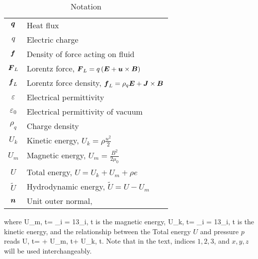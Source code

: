 \begin{table}
\begin{tabular}{ |c|l| }
        $\mbox{\boldmath $q$}$ & Heat flux\\
        $q$ & Electric charge\\
        $\mbox{\boldmath $f$}$ & Density of force acting on fluid\\
        $\mbox{\boldmath $F$}_L$ & Lorentz force, $\mbox{\boldmath $F$}_L = q\left(\mbox{\boldmath $E$} + \mbox{\boldmath $u$}\times\mbox{\boldmath $B$}\right)$\\
        $\mbox{\boldmath $f$}_L$ & Lorentz force density, $\mbox{\boldmath $f$}_L = \rho_q\mbox{\boldmath $E$} + \mbox{\boldmath $J$}\times\mbox{\boldmath $B$}$\\
        $\varepsilon$ & Electrical permittivity\\
        $\varepsilon_0$ & Electrical permittivity of vacuum\\
        $\rho_q$ & Charge density\\
        $U_k$ & Kinetic energy, $U_k = \rho\frac{u^2}{2}$ \\ 
        $U_m$ & Magnetic energy, $U_m = \frac{B^2}{2{}\mu_0}$ \\ 
        $U$ & Total energy, $U = U_k + U_m + \rho e$ \\ 
        $\tilde{U}$ & Hydrodynamic energy, $\tilde{U} = U - U_m$ \\ 
        $\mbox{\boldmath $n$}$ & Unit outer normal, \\ 
        \hline
    \end{tabular}
    \caption{Notation}
    \label{table:notation}
\end{table}
where
\be
\label{magU}
U_m\lo\bfx, t\ro =  \sum_{i = 1}{3}\bfB_i\lo\bfx, t\ro
\ee
is the magnetic energy,
\be
\label{kinU}
U_k\lo\bfx, t\ro =  \sum_{i = 1}{3}\bfu_i\lo\bfx, t\ro
\ee
is the kinetic energy, and the relationship between the Total energy $U$ and pressure $p$ reads
\be
\label{presU}
U\lo\bfx, t\ro =  + U_m\lo\bfx, t\ro + U_k\lo\bfx, t\ro.
\ee
Note that in the text, indices $1, 2, 3$, and $x, y, z$ will be used interchangeably.
